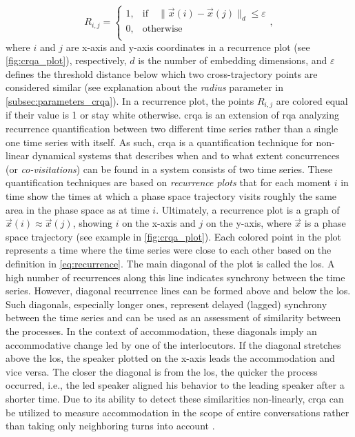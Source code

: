 \begin{equation}
	\label{eq:recurrence}
	R_{i,j} =
	\begin{cases}
		1,	&	\text{if} \quad \lVert \vec{x}(i)-\vec{x}(j) \rVert_d \leq \varepsilon \\
		0,	&	\text{otherwise} \\
	\end{cases},
\end{equation}
%
where $i$ and $j$ are x-axis and y-axis coordinates in a recurrence plot (see \cref{fig:crqa_plot}), respectively, $d$ is the number of embedding dimensions, and $\varepsilon$ defines the threshold distance below which two cross-trajectory points are considered similar (see explanation about the \emph{radius} parameter in \cref{subsec:parameters_crqa}).
In a recurrence plot, the points $R_{i,j}$ are colored equal if their value is 1 or stay white otherwise.
\Ac{crqa} is an extension of \ac{rqa} analyzing recurrence quantification between two different time series rather than a single one time series with itself.
As such, \ac{crqa} is a quantification technique for non-linear dynamical systems that describes when and to what extent concurrences (or \emph{co-visitations}) can be found in a system consists of two time series.
These quantification techniques are based on \emph{recurrence plots} that for each moment $i$ in time show the times at which a phase space trajectory visits roughly the same area in the phase space as at time $i$.
Ultimately, a recurrence plot is a graph of $\vec{x}(i) \approx \vec{x}(j)$, showing $i$ on the x-axis and $j$ on the y-axis, where $\vec{x}$ is a phase space trajectory (see example in \cref{fig:crqa_plot}).
Each colored point in the plot represents a time where the time series were close to each other based on the definition in \cref{eq:recurrence}.
The main diagonal of the plot is called the \acf{los}.
A high number of recurrences along this line indicates synchrony between the time series.
However, diagonal recurrence lines can be formed above and below the \ac{los}.
Such diagonals, especially longer ones, represent delayed (lagged) synchrony between the time series and can be used as an assessment of similarity between the processes.
In the context of accommodation, these diagonals imply an accommodative change led by one of the interlocutors.
If the diagonal stretches above the \ac{los}, the speaker plotted on the x-axis leads the accommodation and vice versa.
The closer the diagonal is from the \ac{los}, the quicker the process occurred, i.e., the led speaker aligned his behavior to the leading speaker after a shorter time.
Due to its ability to detect these similarities non-linearly, \ac{crqa} can be utilized to measure accommodation in the scope of entire conversations rather than taking only neighboring turns into account \citep[cf.][]{Levitan2013entrainment}.

